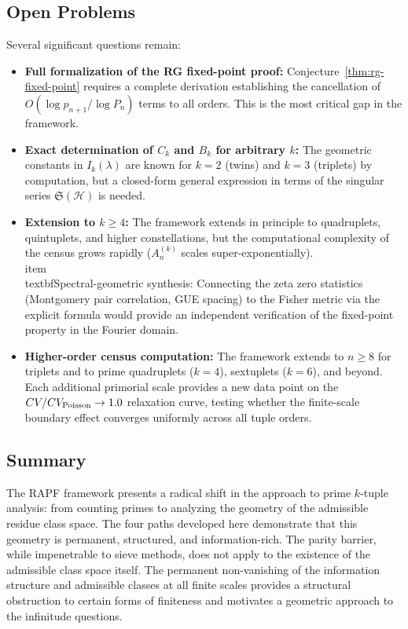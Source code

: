 \documentclass[11pt]{article}
\theoremstyle{remark}
\begin{document}
\subsection*{Open Problems}
Several significant questions remain:
\begin{itemize}
    \item \textbf{Full formalization of the RG fixed-point proof:}
    Conjecture~\ref{thm:rg-fixed-point} requires a complete derivation
    establishing the cancellation of $O(\log p_{n+1}/\log P_n)$ terms to
    all orders. This is the most critical gap in the framework.
    \item \textbf{Exact determination of $C_k$ and $B_k$ for arbitrary $k$:}
    The geometric constants in $I_k(\lambda)$ are known for $k=2$
    (twins) and $k=3$ (triplets) by computation, but a closed-form
    general expression in terms of the singular series
    $\mathfrak{S}(\mathcal{H})$ is needed.
    \item \textbf{Extension to $k \geq 4$:} The framework extends in
    principle to quadruplets, quintuplets, and higher constellations,
    but the computational complexity of the census grows rapidly
    ($A_n^{(k)}$ scales super-exponentially).
    \\item \\textbf{Spectral-geometric synthesis:} Connecting the
    zeta zero statistics (Montgomery pair correlation, GUE spacing)
    to the Fisher metric via the explicit formula would provide an
    independent verification of the fixed-point property in the
    Fourier domain.
    \item \textbf{Higher-order census computation:} The framework extends
    to $n \geq 8$ for triplets and to prime quadruplets ($k=4$), sextuplets
    ($k=6$), and beyond. Each additional primorial scale provides a new
    data point on the $CV/CV_{\rm Poisson} \to 1.0$ relaxation curve,
    testing whether the finite-scale boundary effect converges uniformly
    across all tuple orders.
\end{itemize}

\subsection*{Summary}

The RAPF framework presents a radical shift in the approach to prime
$k$-tuple analysis: from counting primes to analyzing the geometry of
the admissible residue class space. The four paths developed here
demonstrate that this geometry is permanent, structured, and
information-rich. The parity barrier, while impenetrable to sieve methods,
does not apply to the existence of the admissible class space itself.
The permanent non-vanishing of the information structure and admissible
classes at all finite scales provides a structural obstruction to certain
forms of finiteness and motivates a geometric approach to the infinitude
questions.
\end{document}
